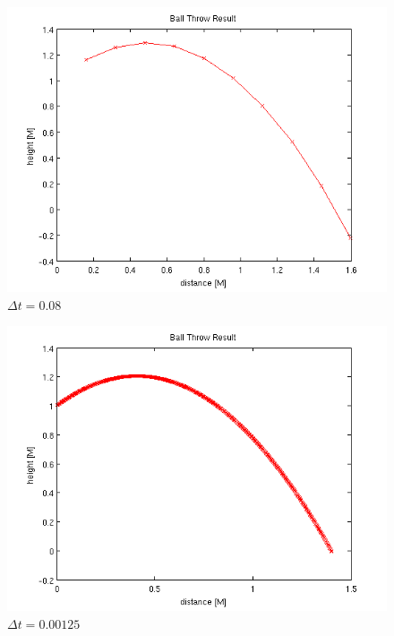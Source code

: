 \begin{figure}
\centering
\includegraphics[scale=0.75]{lesstime}
\caption{$\Delta t = 0.08$ \label{lesst}}
\end{figure}

\begin{figure}
\centering
\includegraphics[scale=0.75]{moartime}
\caption{$\Delta t = 0.00125$ \label{moart}}
\end{figure}

